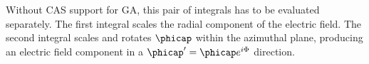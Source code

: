 Without CAS support for GA, this pair of integrals has to be evaluated separately.
The first integral
scales the radial component of the electric field.
The second integral scales and rotates \( \phicap \) within the azimuthal plane, producing an electric field component in a \( \phicap' = \phicap e^{i \Phi} \) direction.


